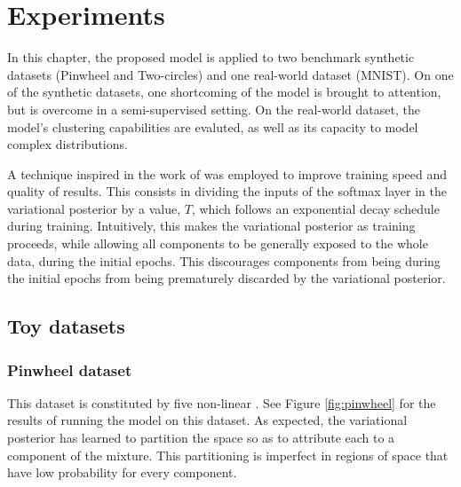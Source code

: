 \chapter{Experiments}
\label{chapter:experiments}

In this chapter, the proposed model is applied to two benchmark synthetic datasets (Pinwheel
and Two-circles) and one real-world dataset (MNIST). On one of the synthetic
datasets, one shortcoming of the model is brought to attention, but is overcome
in a semi-supervised setting. On the real-world dataset, the model's clustering
capabilities are evaluted, as well as its capacity to model complex distributions.

A technique inspired in the work of \textcite{mixae} was employed to improve training
speed and quality of results. This consists in dividing the inputs of the softmax layer in
the variational posterior by a  value, $T$, which follows
an exponential decay schedule during training. Intuitively, this makes the
variational posterior  as training proceeds, while allowing all
components to be generally exposed to the whole data, during the initial epochs.
This discourages components from being  during the initial epochs
from being prematurely discarded by the variational posterior.

\section{Toy datasets}
\subsection{Pinwheel dataset}

This dataset is constituted by five non-linear . See Figure \ref{fig:pinwheel}
for the results of running the model on this dataset. As expected, the variational
posterior has learned to partition the space so as to attribute each  to
a component of the mixture. This partitioning is imperfect in regions of space
that have low probability for every component.

